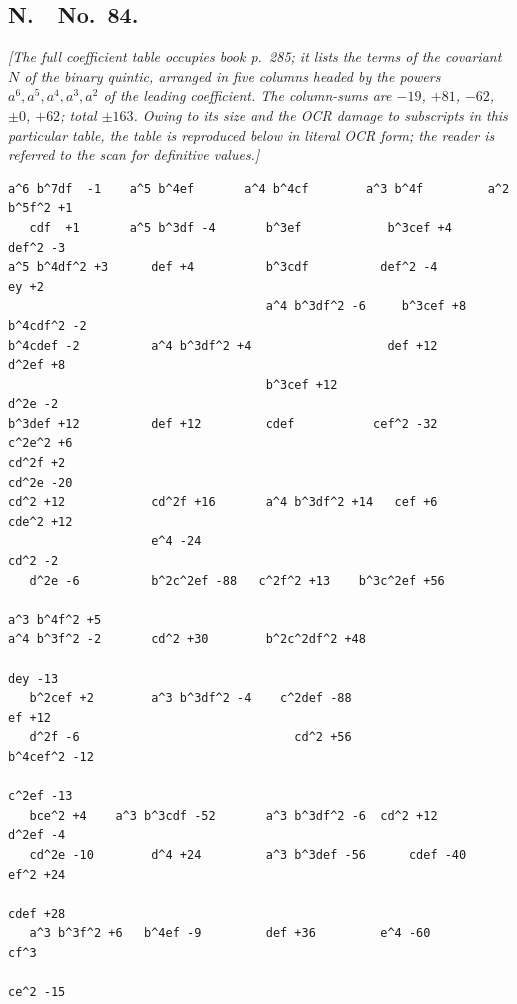 \documentclass[11pt]{article}
\begin{document}
\subsection*{N.\ \ No.\ 84.}

\textit{[The full coefficient table occupies book p.~285; it lists the terms of the covariant $N$ of the binary quintic, arranged in five columns headed by the powers $a^6, a^5, a^4, a^3, a^2$ of the leading coefficient. The column-sums are $-19$, $+81$, $-62$, $\pm 0$, $+62$; total $\pm 163$. Owing to its size and the OCR damage to subscripts in this particular table, the table is reproduced below in literal OCR form; the reader is referred to the scan for definitive values.]}

\smallskip

\begin{small}
\begin{verbatim}
a^6 b^7df  -1    a^5 b^4ef       a^4 b^4cf        a^3 b^4f         a^2 b^5f^2 +1
   cdf  +1       a^5 b^3df -4       b^3ef            b^3cef +4         def^2 -3
a^5 b^4df^2 +3      def +4          b^3cdf          def^2 -4         ey +2
                                    a^4 b^3df^2 -6     b^3cef +8     b^4cdf^2 -2
b^4cdef -2          a^4 b^3df^2 +4                   def +12          d^2ef +8
                                    b^3cef +12                        d^2e -2
b^3def +12          def +12         cdef           cef^2 -32          c^2e^2 +6
cd^2f +2                                                              cd^2e -20
cd^2 +12            cd^2f +16       a^4 b^3df^2 +14   cef +6           cde^2 +12
                    e^4 -24                                              cd^2 -2
   d^2e -6          b^2c^2ef -88   c^2f^2 +13    b^3c^2ef +56
                                                                       a^3 b^4f^2 +5
a^4 b^3f^2 -2       cd^2 +30        b^2c^2df^2 +48
                                                                          dey -13
   b^2cef +2        a^3 b^3df^2 -4    c^2def -88                          ef +12
   d^2f -6                              cd^2 +56                       b^4cef^2 -12
                                                                          c^2ef -13
   bce^2 +4    a^3 b^3cdf -52       a^3 b^3df^2 -6  cd^2 +12              d^2ef -4
   cd^2e -10        d^4 +24         a^3 b^3def -56      cdef -40         ef^2 +24
                                                                           cdef +28
   a^3 b^3f^2 +6   b^4ef -9         def +36         e^4 -60               cf^3
                                                                          ce^2 -15

\end{verbatim}
\end{small}
\end{document}
